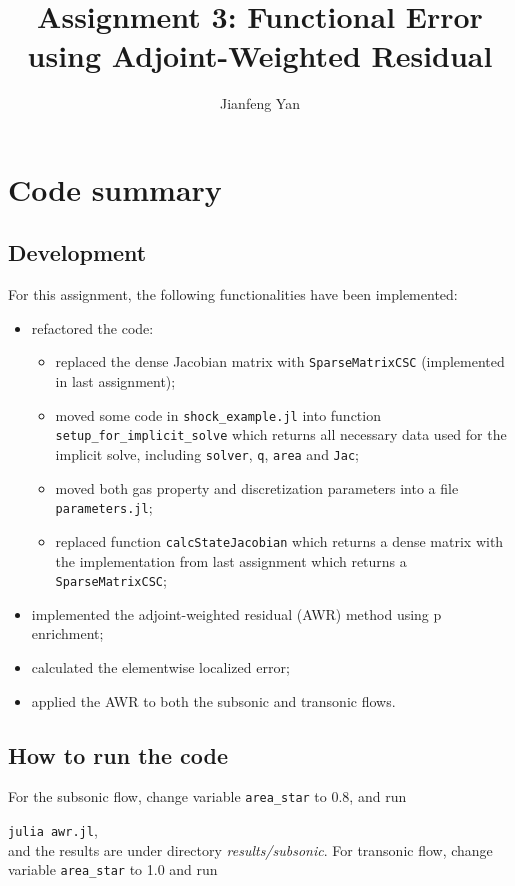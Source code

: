 \documentclass[a4paper]{article}
\title{Assignment 3: Functional Error using Adjoint-Weighted Residual}
\author{Jianfeng Yan}
\begin{document}
 \maketitle
 
\begin{abstract}
  
\end{abstract}

\section{Code summary}
\subsection{Development}
For this assignment, the following functionalities have been implemented:
\begin{itemize}
  \item refactored the code: 
  \begin{itemize}
    \item replaced the dense Jacobian matrix with \texttt{SparseMatrixCSC} (implemented in last assignment);
    \item moved some code in \texttt{shock\_example.jl} into function \texttt{setup\_for\_implicit\_solve} which returns all necessary data used for the implicit solve, including \texttt{solver}, \texttt{q}, \texttt{area} and \texttt{Jac};
    \item moved both gas property and discretization parameters into a file \texttt{parameters.jl};
    \item replaced function \texttt{calcStateJacobian} which returns a dense matrix with the implementation from last assignment which returns a \texttt{SparseMatrixCSC}; 
  \end{itemize}
  \item implemented the adjoint-weighted residual (AWR) method using p enrichment;
  \item calculated the elementwise localized error;
  \item applied the AWR to both the subsonic and transonic flows.
\end{itemize}
\subsection{How to run the code}
For the subsonic flow, change variable \texttt{area\_star} to 0.8, and run

\hspace{1cm}\texttt{julia awr.jl},\\ 
and the results are under directory \textit{results/subsonic}.
For transonic flow, change variable \texttt{area\_star} to 1.0 and run
 
\end{document}
